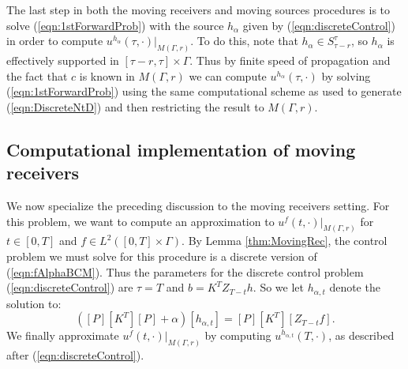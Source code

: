 \documentclass[final,leqno]{siamart1116}
\begin{document}
The last step in both the moving receivers and moving sources
procedures is to solve (\ref{eqn:1stForwardProb}) with the source
$h_\alpha$ given by (\ref{eqn:discreteControl}) in order to compute
$u^{h_\alpha}(\tau,\cdot)|_{M(\Gamma,r)}$. To do this, note that
$h_\alpha \in S_{\tau-r}^\tau$, so $h_\alpha$ is effectively supported
in $[\tau-r,\tau] \times \Gamma$. Thus by finite speed of propagation
and the fact that $c$ is known in $M(\Gamma,r)$ we can compute
$u^{h_\alpha}(\tau,\cdot)$ by solving (\ref{eqn:1stForwardProb}) using
the same computational scheme as used to generate
(\ref{eqn:DiscreteNtD}) and then restricting the result to
$M(\Gamma,r)$.

\subsection{Computational implementation of moving receivers}

We now specialize the preceding discussion to the moving receivers
setting. For this problem, we want to compute an approximation to
$u^f(t,\cdot)|_{M(\Gamma,r)}$ for $t \in [0,T]$ and $f \in L^2([0,T]
\times \Gamma)$. By Lemma \ref{thm:MovingRec}, the control problem
we must solve for this procedure is a discrete version of
(\ref{eqn:fAlphaBCM}). Thus the parameters for the discrete control
problem (\ref{eqn:discreteControl}) are $\tau = T$ and $b = K^T
Z_{T-t} h$. So we let $h_{\alpha,t}$ denote the solution to:
\begin{equation}
  \label{eqn:discreteMvngRec}
  ([P] [K^T] [P] + \alpha) [h_{\alpha,t}] = [P] [K^T] [Z_{T - t} f].
\end{equation} 
We finally approximate  $u^f(t,\cdot)|_{M(\Gamma,r)}$ by computing
$u^{h_{\alpha,t}}(T,\cdot)$, as described after
(\ref{eqn:discreteControl}).
\end{document}
